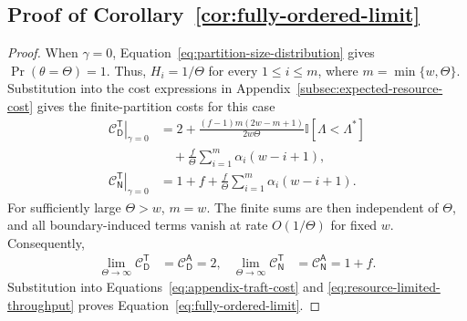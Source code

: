 \subsection{Proof of Corollary~\ref{cor:fully-ordered-limit}}
\begin{proof}
When $\gamma=0$, Equation~\ref{eq:partition-size-distribution} gives
$\Pr(\theta=\Theta)=1$. Thus, $H_i=1/\Theta$ for every
$1\leq i\leq m$, where $m=\min\{w,\Theta\}$. Substitution into
the cost expressions in Appendix~\ref{subsec:expected-resource-cost} gives the finite-partition costs for this case
\begin{align*}
\left.\mathcal{C}_{\mathsf{D}}^{\mathsf{T}}\right|_{\gamma=0}
&=2+\frac{(f-1)m(2w-m+1)}{2w\Theta}
\mathbb{I}[\Lambda<\Lambda^*]\\
&\quad+\frac{f}{\Theta}
\sum_{i=1}^{m}\alpha_i(w-i+1),\\
\left.\mathcal{C}_{\mathsf{N}}^{\mathsf{T}}\right|_{\gamma=0}
&=1+f+\frac{f}{\Theta}
\sum_{i=1}^{m}\alpha_i(w-i+1).
\end{align*}
For sufficiently large $\Theta>w$, $m=w$. The finite sums are then independent
of $\Theta$, and all boundary-induced terms vanish at rate
$O(1/\Theta)$ for fixed $w$. Consequently,
\begin{align*}
\lim_{\Theta\to\infty}\mathcal{C}_{\mathsf{D}}^{\mathsf{T}}
&=\mathcal{C}_{\mathsf{D}}^{\mathsf{A}}=2, &
\lim_{\Theta\to\infty}\mathcal{C}_{\mathsf{N}}^{\mathsf{T}}
&=\mathcal{C}_{\mathsf{N}}^{\mathsf{A}}=1+f.
\end{align*}
Substitution into Equations~\ref{eq:appendix-traft-cost} and
\ref{eq:resource-limited-throughput} proves
Equation~\ref{eq:fully-ordered-limit}.
\end{proof}






